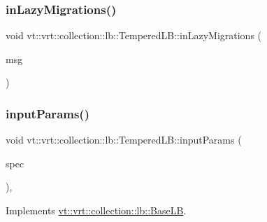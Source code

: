 \subsubsection{\texorpdfstring{in\+Lazy\+Migrations()}{inLazyMigrations()}}
{\footnotesize\ttfamily void vt\+::vrt\+::collection\+::lb\+::\+Tempered\+L\+B\+::in\+Lazy\+Migrations (\begin{DoxyParamCaption}\item[{\hyperlink{structvt_1_1vrt_1_1collection_1_1balance_1_1_lazy_migration_msg}{balance\+::\+Lazy\+Migration\+Msg} $\ast$}]{msg }\end{DoxyParamCaption})\hspace{0.3cm}{\ttfamily [protected]}}

\mbox{\label{structvt_1_1vrt_1_1collection_1_1lb_1_1_tempered_l_b_a12430d0bfd997324ac4343d736d0572e}} 
\subsubsection{\texorpdfstring{input\+Params()}{inputParams()}}
{\footnotesize\ttfamily void vt\+::vrt\+::collection\+::lb\+::\+Tempered\+L\+B\+::input\+Params (\begin{DoxyParamCaption}\item[{\hyperlink{structvt_1_1vrt_1_1collection_1_1balance_1_1_spec_entry}{balance\+::\+Spec\+Entry} $\ast$}]{spec }\end{DoxyParamCaption})\hspace{0.3cm}{\ttfamily [override]}, {\ttfamily [virtual]}}



Implements \hyperlink{structvt_1_1vrt_1_1collection_1_1lb_1_1_base_l_b_a555e29aadfd428383464d6dd007506b6}{vt\+::vrt\+::collection\+::lb\+::\+Base\+LB}.

\mbox{\label{structvt_1_1vrt_1_1collection_1_1lb_1_1_tempered_l_b_ab737fad35804f7a6db9ae67a7a5fa982}} 
